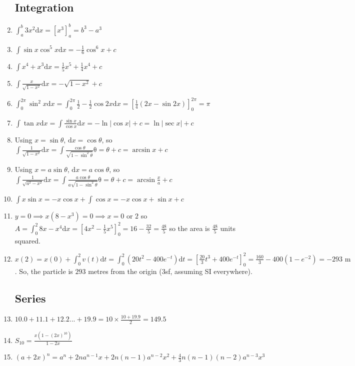 \documentclass{article}
\begin{document}
\begin{enumerate}
\subsection{Integration}
    \item $\int_{a}^{b} 3x^2 \mathrm{d}x=[x^3]_{a}^{b}=b^3-a^3$
    \item $\int \sin{x} \cos^5{x} \mathrm{d} x= -\frac{1}{6} \cos^6{x} + c$
    \item $\int x^4 + x^3 \mathrm{d} x = \frac{1}{5}x^5 + \frac{1}{4} x^4 + c$
    \item $\int \frac{x}{\sqrt{1-x^2}} \mathrm{d} x=-\sqrt{1-x^2}+c$
    \item $\int_{0}^{2\pi} \sin^2{x} \mathrm{d} x= \int_{0}^{2\pi} \frac{1}{2} - \frac{1}{2}\cos{2x} \mathrm{d} x = [\frac{1}{4}(2x-\sin{2x})]_0^{2\pi}=\pi$
    \item $\int \tan{x} \mathrm{d}x = \int \frac{\sin{x}}{\cos{x}} \mathrm{d} x = -\ln{|\cos{x}|} + c = \ln{|\sec{x}|} + c$
    \item Using $x=\sin{\theta}$, $\mathrm{d} x = \cos{\theta}$, so $\int \frac{1}{\sqrt{1-x^2}} \mathrm{d}x =\int \frac{\cos{\theta}}{\sqrt{1-\sin^2{\theta}}} \mathrm{\theta} = \theta + c = \arcsin{x}+c$
    \item Using $x=a\sin{\theta}$, $\mathrm{d} x = a\cos{\theta}$, so $\int \frac{1}{\sqrt{a^2-x^2}} \mathrm{d}x =\int \frac{a\cos{\theta}}{a\sqrt{1-\sin^2{\theta}}} \mathrm{\theta} = \theta + c = \arcsin{\frac{x}{a}}+c$
    \item $\int x \sin{x} = -x \cos{x} + \int \cos{x} = -x \cos{x} + \sin{x} +c$
    \item $y=0 \implies x(8-x^3)=0 \implies x=0 \text{ or } 2$ so $A=\int_{0}^{2} 8x-x^4 \mathrm{d}x=[4x^2 - \frac{1}{5} x^5]_0^2=16-\frac{32}{5}=\frac{48}{5}$ so the area is $\frac{48}{5}$ units squared.
    \item $x(2)=x(0)+\int_{0}^{2}v(t) \mathrm{d}t = \int_{0}^{2} (20t^2 - 400 e^{-t}) \mathrm{d}t=[\frac{20}{3}t^3+400e^{-t}]_0^2=\frac{160}{3} - 400 (1-e^{-2})= -293 \text{ m}$. So, the particle is $293$ metres from the origin (3sf, assuming SI everywhere).
\subsection{Series}
    \item $10.0 + 11.1 + 12.2 ... + 19.9 = 10 \times \frac{10+19.9}{2}=149.5$
    \item $S_10 = \frac{x(1-(2x)^10)}{1-2x}$
    \item $(a+2x)^n = a^n + 2na^{n-1} x + 2n(n-1) a^{n-2} x^2 + \frac{4}{3} n(n-1)(n-2) a^{n-3} x^3$

\end{enumerate}
\end{document}
